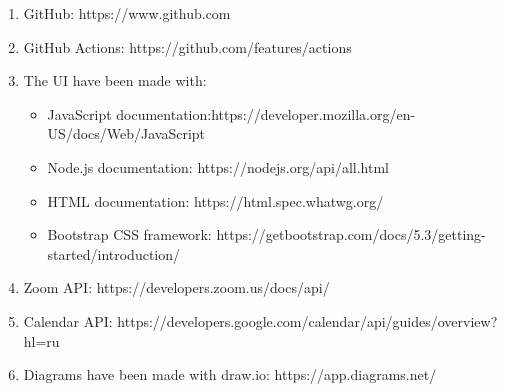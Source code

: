 \begin{enumerate}
    \item GitHub: https://www.github.com
    \item GitHub Actions: https://github.com/features/actions
    \item The UI have been made with:
    \begin{itemize}
    \item JavaScript documentation:https://developer.mozilla.org/en-US/docs/Web/JavaScript 
    \item Node.js documentation: https://nodejs.org/api/all.html
    \item HTML documentation: https://html.spec.whatwg.org/
    \item Bootstrap CSS framework: https://getbootstrap.com/docs/5.3/getting-started/introduction/
    \end{itemize}
   
    \item Zoom API: https://developers.zoom.us/docs/api/
    \item Calendar API: https://developers.google.com/calendar/api/guides/overview?hl=ru
    \item Diagrams have been made with draw.io: https://app.diagrams.net/ 
   
\end{enumerate}